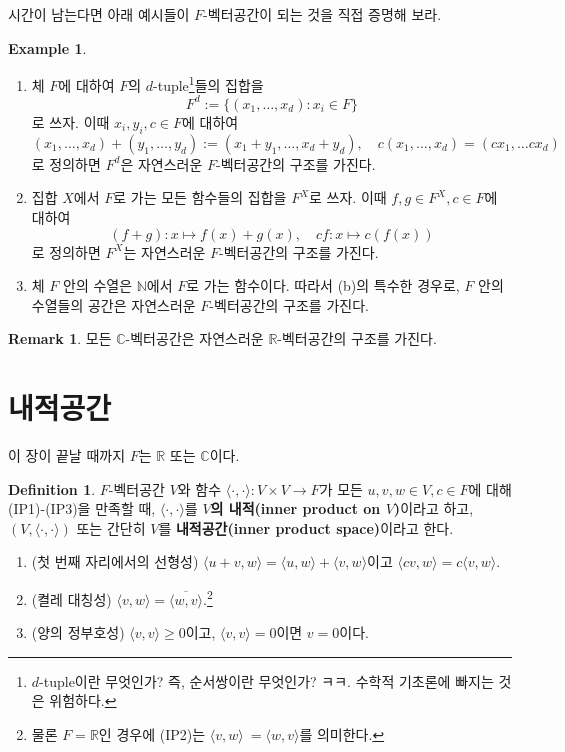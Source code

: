\documentclass[11pt]{book}
\numberwithin{equation}{chapter}
\def\NN{\mathbb{N}}
\def\RR{\mathbb{R}}
\def\CC{\mathbb{C}}
\newcommand{\inner}[2]{\langle#1, #2\rangle}
\theoremstyle{definition}
\newtheorem{defn}[thm]{Definition}
\newtheorem*{rem}{Remark}
\newtheorem*{ex}{Example}
\begin{document}
시간이 남는다면 아래 예시들이 \(F\)-벡터공간이 되는 것을 직접 증명해 보라.

\begin{ex}
    \quad

    \begin{enumerate} [label=(\alph*), leftmargin=2\parindent]
        \item 체 \(F\)에 대하여 \(F\)의 \(d\)-tuple\footnote{\(d\)-tuple이란 무엇인가? 즉, 순서쌍이란 무엇인가? ㅋㅋ. 수학적 기초론에 빠지는 것은 위험하다.}들의 집합을
        \[
        F^d := \{(x_1, \ldots, x_d) : x_i \in F\}    
        \]
        로 쓰자. 이때 \(x_i, y_i, c \in F\)에 대하여
        \[
        (x_1, \ldots, x_d) + (y_1, \ldots, y_d) := (x_1 + y_1, \ldots, x_d + y_d), \quad c(x_1, \ldots, x_d) = (cx_1, \ldots cx_d)
        \]
        로 정의하면 \(F^d\)은 자연스러운 \(F\)-벡터공간의 구조를 가진다.
        \item 집합 \(X\)에서 \(F\)로 가는 모든 함수들의 집합을 \(F^X\)로 쓰자. 이때 \(f, g \in F^X, c \in F\)에 대하여
        \[
        (f+g) : x \mapsto f(x) + g(x), \quad cf : x \mapsto c(f(x))   
        \]
        로 정의하면 \(F^X\)는 자연스러운 \(F\)-벡터공간의 구조를 가진다.
        \item 체 \(F\) 안의 수열은 \(\NN\)에서 \(F\)로 가는 함수이다. 따라서 (b)의 특수한 경우로, \(F\) 안의 수열들의 공간은 자연스러운 \(F\)-벡터공간의 구조를 가진다.
    \end{enumerate}
\end{ex}

\begin{rem}
    모든 \(\CC\)-벡터공간은 자연스러운 \(\RR\)-벡터공간의 구조를 가진다.
\end{rem}


\section{내적공간}
이 장이 끝날 때까지 \(F\)는 \(\RR\) 또는 \(\CC\)이다.

\begin{defn}
    \(F\)-벡터공간 \(V\)와 함수 \(\inner{\cdot}{\cdot}: V \times V \rightarrow F\)가 모든 \(u, v, w \in V, c \in F\)에 대해 (IP1)-(IP3)을 만족할 때, \(\inner{\cdot}{\cdot}\)를 \textbf{\(V\)의 내적(inner product on \(V\))}이라고 하고, \((V, \inner{\cdot}{\cdot})\) 또는 간단히 \(V\)를 \textbf{내적공간(inner product space)}이라고 한다.
    \begin{enumerate}[label=(IP\arabic*), leftmargin=2\parindent]
        \item
        (첫 번째 자리에서의 선형성) \(\inner{u+v}{w} = \inner{u}{w}+ \inner{v}{w}\)이고 \(\inner{cv}{w} = c\inner{v}{w}\).
        \item
        (켤레 대칭성) \(\inner{v}{w} = \overline{\inner{w}{v}}\).\footnote{물론 \(F = \RR\)인 경우에 (IP2)는 \(\inner{v}{w}\ = \inner{w}{v}\)를 의미한다.}
        \item
        (양의 정부호성) \(\inner{v}{v} \ge 0\)이고, \(\inner{v}{v} = 0\)이면 \(v = 0\)이다.
    \end{enumerate}
\end{defn}
\end{document}
